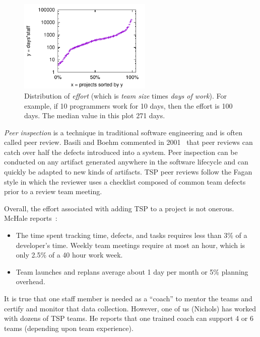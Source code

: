 \documentclass[smallcondensed]{svjour3}
\newcommand{\bi}{\begin{itemize}}%
\newcommand{\ei}{\end{itemize}}
\begin{document}
  
 
 
\begin{figure}
\begin{center} 
\includegraphics[width=2.5in]{dom.pdf}
\end{center} 
\caption{Distribution of 
{\em effort} (which is
{\em team size} times
{\em days of work}). For example, if 10 programmers work for 10 days,
then the effort is 100 days. The median value in this plot
 271 days.}\label{fig:dist}
\end{figure}

{\em Peer inspection} is a  technique in
traditional software engineering and is often called peer review.
 Basili and Boehm   commented in 2001~\cite{boehm01} 
that peer reviews can catch over half the defects introduced into a system.
Peer inspection can be conducted on any artifact generated anywhere in the software
lifecycle and can quickly be adapted to new kinds of artifacts. TSP peer reviews follow the Fagan style in which the reviewer uses a checklist composed of common team defects prior to a review team meeting. 
 
Overall, the   effort associated with adding TSP to a project is not onerous. McHale reports~\cite{mchale02}:
\bi
\item
 The time spent  tracking time, defects, and tasks requires less than 3\% of a developer's time. Weekly team meetings  require at most an hour, which is
only 2.5\% of a 40 hour work week. 
\item
Team launches and replans average about 1 day per month or 5\% planning overhead.
\ei
It is true that one staff member is needed as a ``coach'' to mentor the teams
and certify and monitor that data collection. However, one of us (Nichols) has worked with dozens of TSP teams. He reports that one  trained coach can support 4 or 6 teams (depending upon team experience).
 
\end{document}
